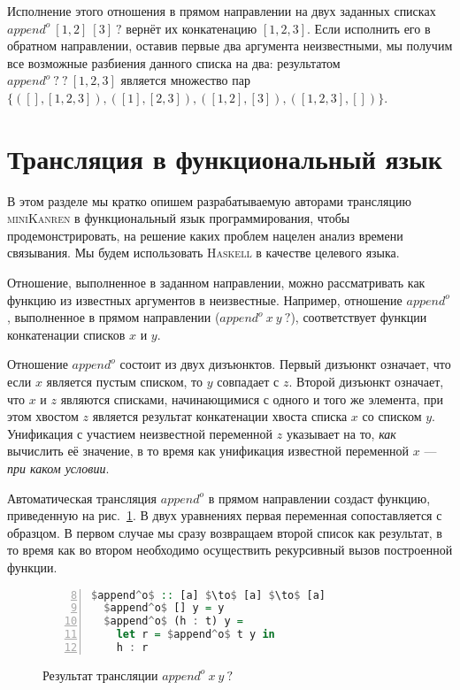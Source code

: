 \documentclass[conference,a4paper,american,russian]{IEEEtran}
\newcommand{\miniKanren}{\textsc{miniKanren}}
\newcommand{\haskell}{\textsc{Haskell}}
\begin{document}
Исполнение этого отношения в прямом направлении на двух заданных списках $append^o \ [1,2] \ [3] \ ?$ вернёт их конкатенацию $[1,2,3]$.
Если исполнить его в обратном направлении, оставив первые два аргумента неизвестными, мы получим все возможные разбиения данного списка на два: результатом $append^o \ ? \ ? \ [1,2,3]$ является множество пар $\{([],[1,2,3]), ([1], [2,3]), ([1,2], [3]), ([1,2,3], [])\}$.

\section{Трансляция в функциональный язык}\label{translator}

В этом разделе мы кратко опишем разрабатываемую авторами трансляцию \miniKanren{} в функциональный язык программирования, чтобы продемонстрировать, на решение каких проблем нацелен анализ времени связывания.
Мы будем использовать \haskell{} в качестве целевого языка.

Отношение, выполненное в заданном направлении, можно рассматривать как функцию из известных аргументов в неизвестные.
Например, отношение $append^o$, выполненное в прямом направлении ($append^o \ x \ y \ ?$), соответствует функции конкатенации списков $x$ и $y$.

Отношение $append^o$ состоит из двух дизъюнктов.
Первый дизъюнкт означает, что если $x$ является пустым списком, то $y$ совпадает с $z$.
Второй дизъюнкт означает, что $x$ и $z$ являются списками, начинающимися с одного и того же элемента, при этом хвостом $z$ является результат конкатенации хвоста списка $x$ со списком $y$.
Унификация с участием неизвестной переменной $z$ указывает на то, \emph{как} вычислить её значение, в то время как унификация  известной переменной $x$ --- \emph{при каком условии}.

Автоматическая трансляция $append^o$ в прямом направлении создаст функцию, приведенную на рис.~\ref{lst:appendoFWD}.
В двух уравнениях первая переменная сопоставляется с образцом.
В первом случае мы сразу возвращаем второй список как результат, в то время как во втором необходимо осуществить рекурсивный вызов построенной функции.

\begin{figure}[h!]
  \begin{center}
  \begin{minipage}{0.35\textwidth}
  \begin{lstlisting}[language=Haskell, frame=single, numbers=left,numberstyle=\small, firstnumber=8, escapechar=|]
  $append^o$ :: [a] $\to$ [a] $\to$ [a]
  $append^o$ [] y = y
  $append^o$ (h : t) y =
    let r = $append^o$ t y in
    h : r
  \end{lstlisting}
  \end{minipage}
  \end{center}
  \caption{Результат трансляции $append^o \ x \ y \ ?$}
  \label{lst:appendoFWD}
\end{figure}
\end{document}
